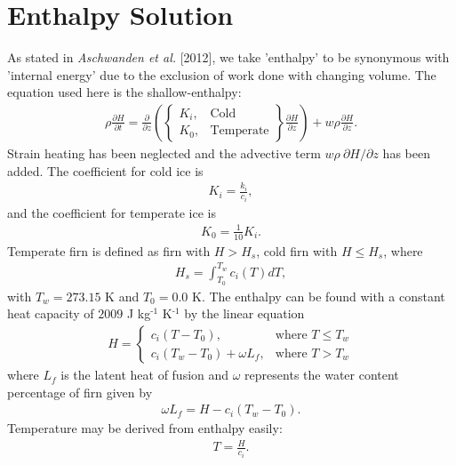 \documentclass{article}%
\newcommand{\sups}[1]{\ensuremath{^{\textrm{#1}}}}
\begin{document}
\section{Enthalpy Solution}

As stated in \emph{Aschwanden et al.} [2012], we take 'enthalpy' to be synonymous with 'internal energy' due to the exclusion of work done with changing volume.  The equation used here is the shallow-enthalpy:
\begin{align}
  \rho \frac{\partial H}{\partial t} = \frac{\partial}{\partial z} 
    \left( 
      \begin{Bmatrix}
        K_i, &\text{Cold}\\
        K_0, &\text{Temperate}
      \end{Bmatrix}
      \frac{\partial H}{\partial z} 
    \right) + w \rho \frac{\partial H}{\partial z}.
\end{align}
Strain heating has been neglected and the advective term $w \rho\ \partial H / \partial z$ has been added.  The coefficient for cold ice is 
\begin{align*}
  K_i = \frac{k_i}{c_i},
\end{align*}
and the coefficient for temperate ice is
\begin{align*}
  K_0 = \frac{1}{10}K_i.
\end{align*}
Temperate firn is defined as firn with $H > H_s$, cold firn with $H \leq H_s$, where
\begin{align*}
  H_s = \int_{T_0}^{T_w}{c_i(T)}dT,
\end{align*}
with $T_w = 273.15$ K and $T_0 = 0.0$ K.  The enthalpy can be found with a constant heat capacity of $2009$ J kg\sups{-1} K\sups{-1} by the linear equation
\begin{align}
  H = 
  \begin{cases}
    c_i(T - T_0), &\text{where } T \leq T_w\\
    c_i(T_w - T_0) + \omega L_f,  &\text{where } T > T_w
  \end{cases}
\end{align}
where $L_f$ is the latent heat of fusion and $\omega$ represents the water content percentage of firn given by
\begin{align}
  \omega L_f = H - c_i(T_w - T_0).
\end{align}
Temperature may be derived from enthalpy easily:
\begin{align}
  T = \frac{H}{c_i}.
\end{align}
\end{document}
